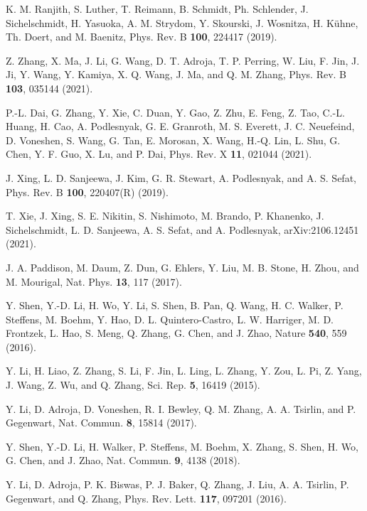 \documentclass[aps,twocolumn,superscriptaddress,showpacs]{revtex4-1}
\begin{document}
\begin{thebibliography}{}
K. M. Ranjith, S. Luther, T. Reimann, B. Schmidt, Ph. Schlender, J. Sichelschmidt, H. Yasuoka, A. M. Strydom, Y. Skourski, J. Wosnitza, H. K\"{u}hne, Th. Doert, and M. Baenitz, Phys. Rev. B {\bf 100}, 224417 (2019).

Z. Zhang, X. Ma, J. Li, G. Wang, D. T. Adroja, T. P. Perring, W. Liu, F. Jin, J. Ji, Y. Wang, Y. Kamiya, X. Q. Wang, J. Ma, and Q. M. Zhang, Phys. Rev. B {\bf 103}, 035144 (2021).

P.-L. Dai, G. Zhang, Y. Xie, C. Duan, Y. Gao, Z. Zhu, E. Feng, Z. Tao, C.-L. Huang, H. Cao, A. Podlesnyak, G. E. Granroth, M. S. Everett, J. C. Neuefeind, D. Voneshen, S. Wang, G. Tan, E. Morosan, X. Wang, H.-Q. Lin, L. Shu, G. Chen, Y. F. Guo, X. Lu, and P. Dai, Phys. Rev. X {\bf 11}, 021044 (2021).

J. Xing, L. D. Sanjeewa, J. Kim, G. R. Stewart, A. Podlesnyak, and A. S. Sefat, Phys. Rev. B {\bf 100}, 220407(R) (2019).

T. Xie, J. Xing, S. E. Nikitin, S. Nishimoto, M. Brando, P. Khanenko, J. Sichelschmidt, L. D. Sanjeewa, A. S. Sefat, and A. Podlesnyak, arXiv:2106.12451 (2021).

J. A. Paddison, M. Daum, Z. Dun, G. Ehlers, Y. Liu, M. B. Stone, H. Zhou, and M. Mourigal, Nat. Phys. {\bf 13}, 117 (2017).

Y. Shen, Y.-D. Li, H. Wo, Y. Li, S. Shen, B. Pan, Q. Wang, H. C. Walker, P. Steffens, M. Boehm, Y. Hao, D. L. Quintero-Castro, L. W. Harriger, M. D. Frontzek, L. Hao, S. Meng, Q. Zhang, G. Chen, and J. Zhao, Nature {\bf 540}, 559 (2016).

Y. Li, H. Liao, Z. Zhang, S. Li, F. Jin, L. Ling, L. Zhang, Y. Zou, L. Pi, Z. Yang, J. Wang, Z. Wu, and Q. Zhang, Sci. Rep. {\bf 5}, 16419 (2015).

Y. Li, D. Adroja, D. Voneshen, R. I. Bewley, Q. M. Zhang, A. A. Tsirlin, and P. Gegenwart, Nat. Commun. {\bf 8}, 15814 (2017).

Y. Shen, Y.-D. Li, H. Walker, P. Steffens, M. Boehm, X. Zhang, S. Shen, H. Wo, G. Chen, and J. Zhao, Nat. Commun. {\bf 9}, 4138 (2018).

Y. Li, D. Adroja, P. K. Biswas, P. J. Baker, Q. Zhang, J. Liu, A. A. Tsirlin, P. Gegenwart, and Q. Zhang, Phys. Rev. Lett. {\bf 117}, 097201 (2016).


\end{thebibliography}
\end{document}

